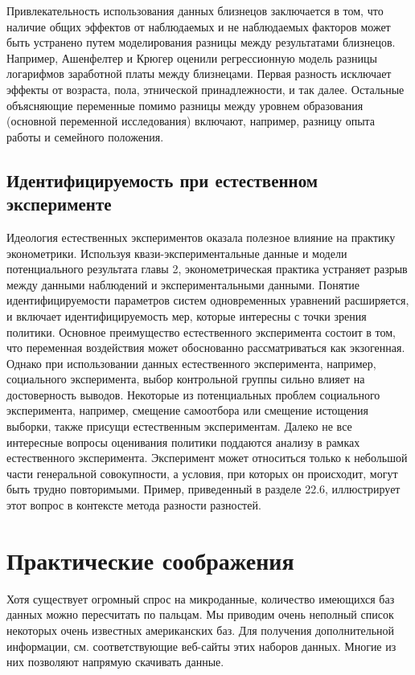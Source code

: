Привлекательность использования данных близнецов заключается в том, что наличие общих эффектов от наблюдаемых и не наблюдаемых факторов может быть устранено путем моделирования разницы между результатами близнецов. Например, Ашенфелтер и Крюгер оценили регрессионную модель разницы логарифмов заработной платы между близнецами. Первая разность исключает эффекты от возраста, пола, этнической принадлежности, и так далее. Остальные объясняющие переменные  помимо разницы между уровнем образования (основной переменной исследования) включают, например, разницу опыта работы и семейного положения.


\subsection{Идентифицируемость при естественном эксперименте}

Идеология естественных экспериментов оказала полезное влияние на практику эконометрики. Используя квази-экспериментальные данные и модели потенциального результата главы 2, эконометрическая практика устраняет разрыв между данными наблюдений и экспериментальными данными. 
Понятие идентифицируемости параметров систем одновременных уравнений расширяется, и включает идентифицируемость мер, которые интересны с точки зрения политики. Основное преимущество  естественного эксперимента состоит в том, что  переменная воздействия может обоснованно рассматриваться как экзогенная. 
Однако при использовании данных естественного эксперимента, например, социального эксперимента, выбор контрольной группы сильно влияет на  достоверность выводов. Некоторые из потенциальных проблем социального эксперимента, например, смещение самоотбора или смещение истощения выборки,  также присущи естественным экспериментам. Далеко не все интересные вопросы оценивания политики поддаются анализу в рамках естественного эксперимента. Эксперимент может относиться только к небольшой части генеральной совокупности, а условия, при которых он происходит, могут быть трудно повторимыми. Пример, приведенный в разделе 22.6, иллюстрирует этот вопрос в контексте метода разности разностей.

\section{Практические соображения}


Хотя существует огромный спрос на микроданные, количество имеющихся баз данных можно пересчитать по пальцам. Мы приводим очень неполный список некоторых  очень известных американских баз. Для получения дополнительной информации, см. соответствующие веб-сайты этих наборов данных. Многие из них позволяют напрямую скачивать данные.


